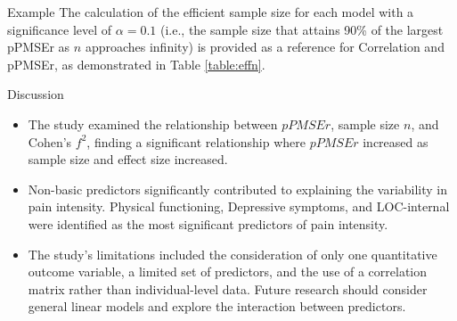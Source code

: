 \documentclass{beamer}
\begin{document}
\begin{frame}{Example}
The calculation of the efficient sample size for each model with a significance level of $\alpha = 0.1$ (i.e., the sample size that attains 90\% of the largest pPMSEr as $n$ approaches infinity) is provided as a reference for Correlation and pPMSEr, as demonstrated in Table \ref{table:effn}.

\begin{table}
\centering
{}
\caption{Efficient sample size n}
 \label{table:effn}
\end{table}
\end{frame}

\begin{frame}{Discussion}
\begin{itemize}
\item The study examined the relationship between $pPMSEr$, sample size $n$, and Cohen's $f^2$, finding a significant relationship where $pPMSEr$ increased as sample size and effect size increased. 
\item Non-basic predictors significantly contributed to explaining the variability in pain intensity. Physical functioning, Depressive symptoms, and LOC-internal were identified as the most significant predictors of pain intensity. 
\item The study's limitations included the consideration of only one quantitative outcome variable, a limited set of predictors, and the use of a correlation matrix rather than individual-level data. Future research should consider general linear models and explore the interaction between predictors.
\end{itemize}

\end{frame}
\end{document}
